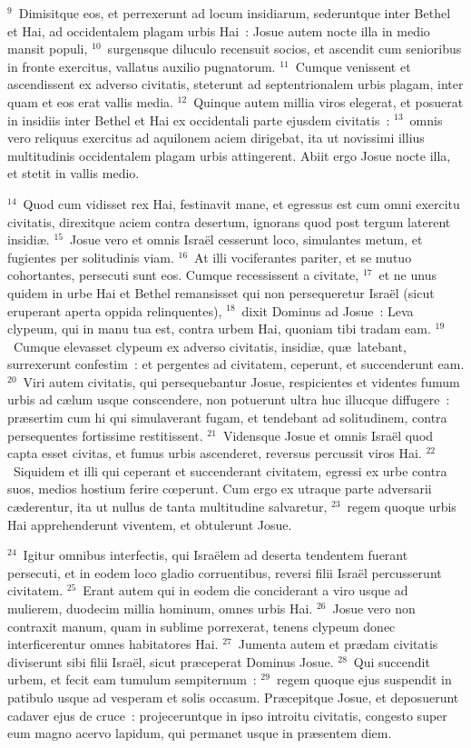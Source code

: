 ${}^{9}$~Dimisitque eos, et perrexerunt ad locum insidiarum, sederuntque inter Bethel et Hai, ad occidentalem plagam urbis Hai~: Josue autem nocte illa in medio mansit populi,
${}^{10}$~surgensque diluculo recensuit socios, et ascendit cum senioribus in fronte exercitus, vallatus auxilio pugnatorum.
${}^{11}$~Cumque venissent et ascendissent ex adverso civitatis, steterunt ad septentrionalem urbis plagam, inter quam et eos erat vallis media.
${}^{12}$~Quinque autem millia viros elegerat, et posuerat in insidiis inter Bethel et Hai ex occidentali parte ejusdem civitatis~:
${}^{13}$~omnis vero reliquus exercitus ad aquilonem aciem dirigebat, ita ut novissimi illius multitudinis occidentalem plagam urbis attingerent. Abiit ergo Josue nocte illa, et stetit in vallis medio.


${}^{14}$~Quod cum vidisset rex Hai, festinavit mane, et egressus est cum omni exercitu civitatis, direxitque aciem contra desertum, ignorans quod post tergum laterent insidi\ae .
${}^{15}$~Josue vero et omnis Isra\"el cesserunt loco, simulantes metum, et fugientes per solitudinis viam.
${}^{16}$~At illi vociferantes pariter, et se mutuo cohortantes, persecuti sunt eos. Cumque recessissent a civitate,
${}^{17}$~et ne unus quidem in urbe Hai et Bethel remansisset qui non persequeretur Isra\"el (sicut eruperant aperta oppida relinquentes),
${}^{18}$~dixit Dominus ad Josue~: Leva clypeum, qui in manu tua est, contra urbem Hai, quoniam tibi tradam eam.
${}^{19}$~Cumque elevasset clypeum ex adverso civitatis, insidi\ae , qu\ae\ latebant, surrexerunt confestim~: et pergentes ad civitatem, ceperunt, et succenderunt eam.
${}^{20}$~Viri autem civitatis, qui persequebantur Josue, respicientes et videntes fumum urbis ad c\ae lum usque conscendere, non potuerunt ultra huc illucque diffugere~: pr\ae sertim cum hi qui simulaverant fugam, et tendebant ad solitudinem, contra persequentes fortissime restitissent.
${}^{21}$~Vidensque Josue et omnis Isra\"el quod capta esset civitas, et fumus urbis ascenderet, reversus percussit viros Hai.
${}^{22}$~Siquidem et illi qui ceperant et succenderant civitatem, egressi ex urbe contra suos, medios hostium ferire cœperunt. Cum ergo ex utraque parte adversarii c\ae derentur, ita ut nullus de tanta multitudine salvaretur,
${}^{23}$~regem quoque urbis Hai apprehenderunt viventem, et obtulerunt Josue.


${}^{24}$~Igitur omnibus interfectis, qui Isra\"elem ad deserta tendentem fuerant persecuti, et in eodem loco gladio corruentibus, reversi filii Isra\"el percusserunt civitatem.
${}^{25}$~Erant autem qui in eodem die conciderant a viro usque ad mulierem, duodecim millia hominum, omnes urbis Hai.
${}^{26}$~Josue vero non contraxit manum, quam in sublime porrexerat, tenens clypeum donec interficerentur omnes habitatores Hai.
${}^{27}$~Jumenta autem et pr\ae dam civitatis diviserunt sibi filii Isra\"el, sicut pr\ae ceperat Dominus Josue.
${}^{28}$~Qui succendit urbem, et fecit eam tumulum sempiternum~:
${}^{29}$~regem quoque ejus suspendit in patibulo usque ad vesperam et solis occasum. Pr\ae cepitque Josue, et deposuerunt cadaver ejus de cruce~: projeceruntque in ipso introitu civitatis, congesto super eum magno acervo lapidum, qui permanet usque in pr\ae sentem diem.


